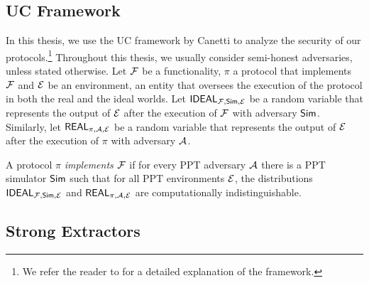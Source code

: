 \subsection{UC Framework}
In this thesis, we use the UC framework by Canetti \cite{FOCS:Canetti01} to analyze the security of our protocols.\footnote{We refer the reader to \cite{FOCS:Canetti01} for a detailed explanation of the framework.} Throughout this thesis, we usually consider semi-honest adversaries, unless stated otherwise. Let $\mathcal{F}$ be a functionality, $\pi$ a protocol that implements $\mathcal{F}$ and  $\mathcal{E}$ be an environment, an entity that oversees the execution of the protocol in both the real and the ideal worlds. Let $\mathsf{IDEAL}_{\mathcal{F},\mathsf{Sim},\mathcal{E}}$ be a random variable that represents the output of $\mathcal{E}$ after the execution of $\mathcal{F}$ with adversary $\mathsf{Sim}$. Similarly, let $\mathsf{REAL}_{\pi,\mathcal{A},\mathcal{E}}$  be a random variable that represents the output of $\mathcal{E}$ after the execution of $\pi$ with adversary $\mathcal{A}$.



\begin{definition}
\label{def:ucsecurity}
A protocol $\pi$ \emph{implements $\mathcal{F}$} if for every PPT adversary $\mathcal{A}$ there is a PPT simulator $\mathsf{Sim}$ such that for all PPT environments $\mathcal{E}$, the distributions $\mathsf{IDEAL}_{\mathcal{F},\mathsf{Sim},\mathcal{E}}$ and $ \mathsf{REAL}_{\pi,\mathcal{A},\mathcal{E}}$ are computationally indistinguishable.
\end{definition}


\subsection{Strong Extractors}

